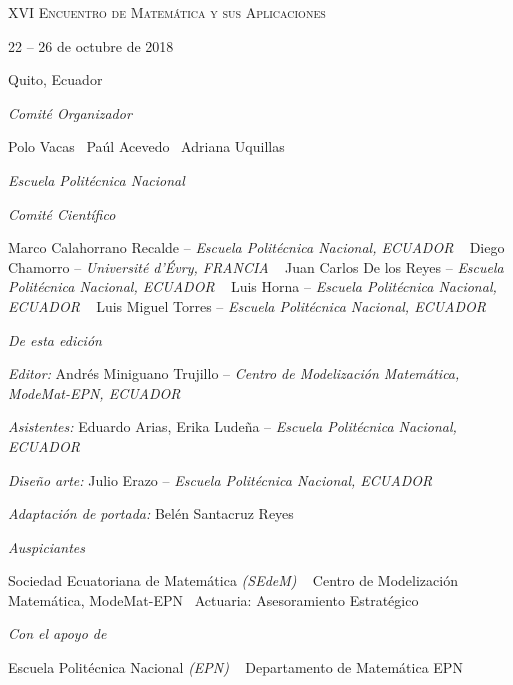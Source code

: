 \documentclass[a5paper,doc,10pt,noapacite]{apa6}
\newcommand{\bull}{\textbullet \ }
\newcommand{\EPN}{Escuela Politécnica Nacional}
\newcommand{\Modemat}{Centro de Modelización Matemática, ModeMat-EPN}%
\begin{document}
\newpage
{}
\mbox{}
\vfill
{
\footnotesize
\textsc{XVI Encuentro de Matemática y sus Aplicaciones}

22 -- 26 de octubre de 2018

Quito, Ecuador

%
\vspace{1\baselineskip}
\emph{Comité Organizador}
\begin{spacing}{1.2}
\scriptsize
	Polo Vacas		\bull Paúl Acevedo	\bull Adriana Uquillas	
	
	\emph{\EPN}
\end{spacing}

%
\vspace{1\baselineskip}
\emph{Comité Científico}
\begin{spacing}{1.2}
\scriptsize
	Marco Calahorrano Recalde	--	\emph{\EPN, ECUADOR} 		\bull 
	Diego Chamorro			-- 	\emph{Université d'Évry, FRANCIA} \bull
	Juan Carlos De los Reyes		-- 	\emph{\EPN, ECUADOR} \bull
	Luis Horna				--	\emph{\EPN, ECUADOR} \bull
	Luis Miguel Torres			--	\emph{\EPN, ECUADOR} 
%		
\end{spacing}

%
\vspace{1\baselineskip}
\emph{De esta edición}
\begin{spacing}{1.2}
\scriptsize
	\emph{Editor:} 	Andrés Miniguano Trujillo 	--	\emph{\Modemat, ECUADOR}
	
	\emph{Asistentes:} Eduardo Arias, Erika Ludeña -- \emph{\EPN, ECUADOR}
	
	\emph{Diseño arte:} Julio Erazo -- \emph{\EPN, ECUADOR}
	
	\emph{Adaptación de portada:} Belén Santacruz Reyes
%		
\end{spacing}

%
\vspace{1\baselineskip}
\emph{Auspiciantes}
\begin{spacing}{1.2}
\scriptsize
	Sociedad Ecuatoriana de Matemática \emph{(SEdeM)}				\bull
	\Modemat													\bull
	Actuaria: Asesoramiento Estratégico
\end{spacing}

%
\vspace{1\baselineskip}
\emph{Con el apoyo de}
\begin{spacing}{1.2}
\scriptsize
	Escuela Politécnica Nacional \emph{(EPN)}						\bull
	Departamento de Matemática EPN
\end{spacing}


}
\end{document}

